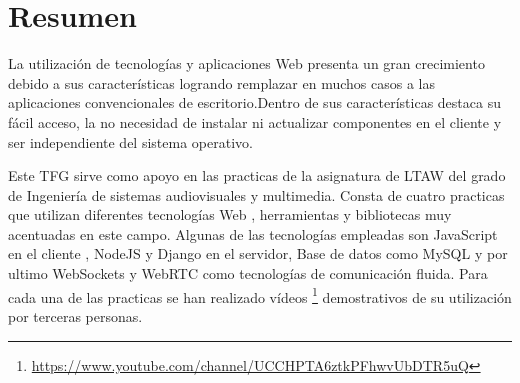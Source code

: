 \documentclass[oneside,a4paper,11pt]{book}
\begin{document}

\clearpage
\thispagestyle{empty}

\vspace{5cm}



\chapter*{Resumen}
\pagestyle{plain}
La utilización de tecnologías y aplicaciones Web presenta un gran crecimiento debido a sus características logrando remplazar en muchos casos a las aplicaciones convencionales de escritorio.Dentro de sus características destaca su fácil acceso, la no necesidad de instalar ni actualizar componentes en el cliente y ser independiente del sistema operativo.

Este TFG sirve  como apoyo en las practicas de la asignatura de LTAW del grado de Ingeniería de sistemas audiovisuales y multimedia. Consta de cuatro practicas que utilizan diferentes tecnologías Web , herramientas y bibliotecas muy acentuadas en este campo. Algunas de las tecnologías empleadas son JavaScript en el cliente , NodeJS y Django en el servidor, Base de datos como MySQL y por ultimo WebSockets y WebRTC como tecnologías de comunicación fluida.
Para cada una de las practicas se han realizado vídeos \footnote{\url{https://www.youtube.com/channel/UCCHPTA6ztkPFhwvUbDTR5uQ}} demostrativos de su utilización por terceras personas.
\end{document}
